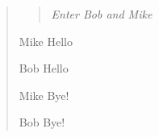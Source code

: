 \documentclass{article}
\begin{document}
\begin{verse}
\begin{list}{}{}

\item\begin{quote}\em Enter Bob and Mike\end{quote}

\item[Mike] Hello
\item[Bob] Hello
\item[Mike] Bye!
\item[Bob] Bye!

\end{list}
\end{verse}
\end{document}

